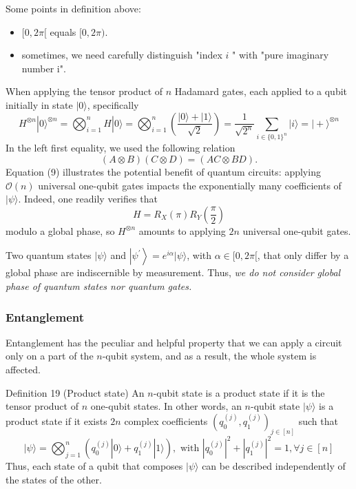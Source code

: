 \begin{remark} 
Some points in definition above:
    \begin{itemize}
        \item $[0,2 \pi[$ equals $[0,2 \pi)$.
        \item sometimes, we need carefully distinguish "index $i$ " with "pure imaginary number i". 
    \end{itemize}
\end{remark}

When applying the tensor product of $n$ Hadamard gates, each applied to a qubit initially in state $|0\rangle$, specifically
\begin{equation*}
H^{\otimes n}|0\rangle^{\otimes n}=\bigotimes_{i=1}^{n} H|0\rangle=\bigotimes_{i=1}^{n}\left(\frac{|0\rangle+|1\rangle}{\sqrt{2}}\right)=\frac{1}{\sqrt{2^{n}}} \sum_{i \in\{0,1\}^{n}}|i\rangle=|+\rangle^{\otimes n} \tag{9}
\end{equation*}
In the left first equality, we used the following relation
$$
(A \otimes B)(C \otimes D)=(A C \otimes B D).
$$
Equation (9) illustrates the potential benefit of quantum circuits: applying $\mathcal{O}(n)$ universal one-qubit gates impacts the exponentially many coefficients of $|\psi\rangle$. Indeed, one readily verifies that 
$$
H=R_{X}(\pi) R_{Y}\left(\frac{\pi}{2}\right)
$$
modulo a global phase, so $H^{\otimes n}$ amounts to applying $2 n$ universal one-qubit gates.

\begin{remark}
    Two quantum states $|\psi\rangle$ and $\left|\psi^{\prime}\right\rangle=e^{i \alpha}|\psi\rangle$, with $\alpha \in[0,2 \pi[$, that only differ by a global phase are indiscernible by measurement. Thus, \textit{we do not consider global phase of quantum states nor quantum gates.} %
\end{remark}

\subsubsection{Entanglement}

Entanglement has the peculiar and helpful property that we can apply a circuit only on a part of the $n$-qubit system, and as a result, the whole system is affected.

Definition 19 (Product state) An $n$-qubit state is a product state if it is the tensor product of $n$ one-qubit states. In other words, an $n$-qubit state $|\psi\rangle$ is a product state if it exists $2 n$ complex coefficients $\left(q_{0}^{(j)}, q_{1}^{(j)}\right)_{j \in[n]}$ such that
$$
|\psi\rangle=\bigotimes_{j=1}^{n}\left(q_{0}^{(j)}|0\rangle+q_{1}^{(j)}|1\rangle\right), \text { with }\left|q_{0}^{(j)}\right|^{2}+\left|q_{1}^{(j)}\right|^{2}=1, \forall j \in[n]
$$
Thus, each state of a qubit that composes $|\psi\rangle$ can be described independently of the states of the other.

